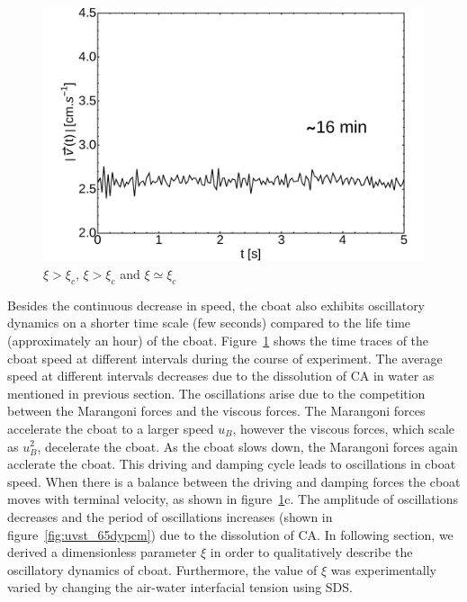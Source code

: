 \documentclass[journal=langd5, manuscript=article, layout=twocolumn]{achemso}
\begin{document}
\begin{figure}[ht]
\begin{minipage}[c]{0.3\linewidth}
		\includegraphics[width=\textwidth]{uvst_72dypcm_c.pdf}
	\end{minipage}
	\caption{$\xi > \xi_{c}$, $\xi > \xi_{c}$ and $\xi \simeq \xi_{c}$}\label{fig:uvst_72dypcm}
\end{figure}
Besides the continuous decrease in speed, the cboat also exhibits oscillatory dynamics on a shorter time scale (few seconds) compared to the life time (approximately an hour) of the cboat. Figure~\ref{fig:uvst_72dypcm} shows the time traces of the cboat speed at different intervals during the course of experiment. The average speed at different intervals decreases due to the dissolution of CA in water as mentioned in previous section. The oscillations arise due to the competition between the Marangoni forces and the viscous forces. The Marangoni forces accelerate the cboat to a larger speed $u_{B}$, however the viscous forces, which scale as $u_{B}^{2}$, decelerate the cboat. As the cboat slows down, the Marangoni forces again acclerate the cboat. This driving and damping cycle leads to oscillations in cboat speed. When there is a balance between the driving and damping forces the cboat moves with terminal velocity, as shown in figure~\ref{fig:uvst_72dypcm}c. The amplitude of oscillations decreases and the period of oscillations increases (shown in figure~\ref{fig:uvst_65dypcm}) due to the dissolution of CA. In following section, we derived a dimensionless parameter $\xi$ in order to qualitatively describe the oscillatory dynamics of cboat. Furthermore, the value of $\xi$ was experimentally varied by changing the air-water interfacial tension using SDS.
\end{document}

